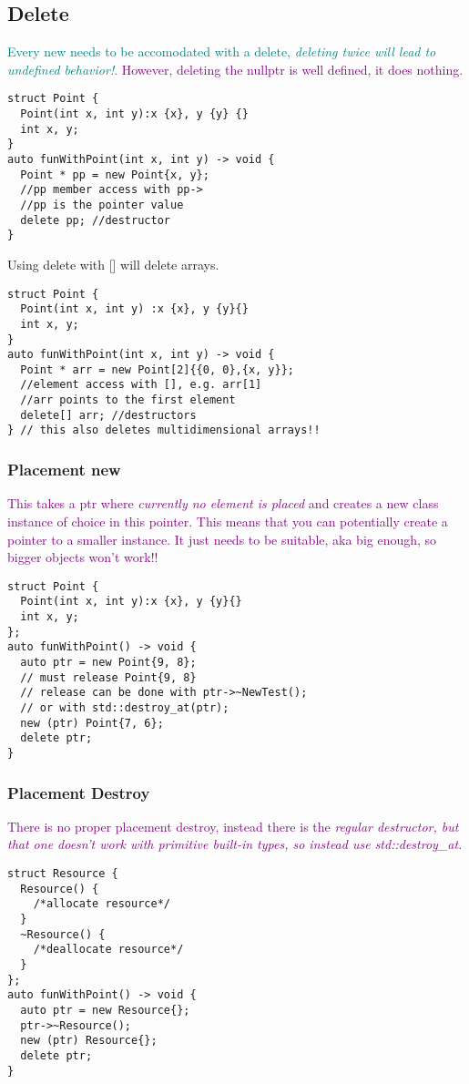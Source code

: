 \documentclass[main.tex,fontsize=8pt,paper=a4,paper=portrait,DIV=calc,]{scrartcl}
\begin{document}
\subsection{Delete}
\textcolor{teal}{Every new needs to be accomodated with a delete, \emph{deleting twice will lead to undefined behavior!}.}\newline
\textcolor{purple}{However, deleting the nullptr is well defined, it does nothing.}
\begin{lstlisting}
struct Point {
  Point(int x, int y):x {x}, y {y} {}
  int x, y;
}
auto funWithPoint(int x, int y) -> void {
  Point * pp = new Point{x, y};
  //pp member access with pp->
  //pp is the pointer value
  delete pp; //destructor
}
\end{lstlisting}
Using delete with [] will delete arrays. 
\begin{lstlisting}
struct Point {
  Point(int x, int y) :x {x}, y {y}{}
  int x, y;
}
auto funWithPoint(int x, int y) -> void {
  Point * arr = new Point[2]{{0, 0},{x, y}};
  //element access with [], e.g. arr[1]
  //arr points to the first element
  delete[] arr; //destructors
} // this also deletes multidimensional arrays!!
\end{lstlisting}

\subsubsection{Placement new}
\textcolor{purple}{This takes a ptr where \emph{currently no element is placed} and creates a new class instance of choice in this pointer.\newline
This means that you can potentially create a pointer to a smaller instance. It just needs to be suitable, aka big enough, so bigger objects won't work!!}
\begin{lstlisting}
struct Point {
  Point(int x, int y):x {x}, y {y}{}
  int x, y;
};
auto funWithPoint() -> void {
  auto ptr = new Point{9, 8};
  // must release Point{9, 8}
  // release can be done with ptr->~NewTest();
  // or with std::destroy_at(ptr);
  new (ptr) Point{7, 6};
  delete ptr;
}
\end{lstlisting}

\subsubsection{Placement Destroy}
\textcolor{purple}{There is no proper placement destroy, instead there is the \emph{regular destructor, but that one doesn't work with primitive built-in types,\newline
so instead use std::destroy\_at.}}
\begin{lstlisting}
struct Resource {
  Resource() {
    /*allocate resource*/
  }
  ~Resource() {
    /*deallocate resource*/
  }
};
auto funWithPoint() -> void {
  auto ptr = new Resource{};
  ptr->~Resource();
  new (ptr) Resource{};
  delete ptr;
}
\end{lstlisting}
\end{document}

